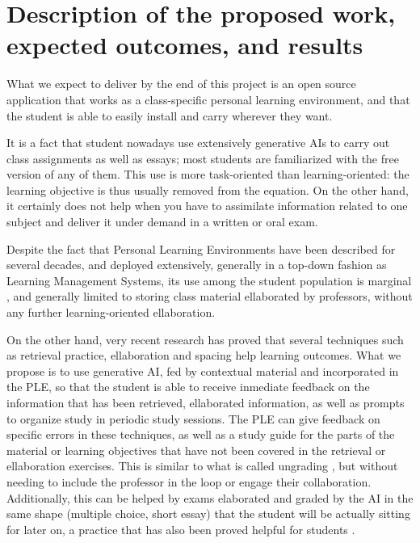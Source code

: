 \documentclass[a4paper,12pt]{article}
\begin{document}
\section{Description of the proposed work, expected outcomes, and results}

What we expect to deliver by the end of this project is an open source
application that works as a class-specific personal learning environment, and
that the student is able to easily install and carry wherever they want.

It is a fact that student nowadays use extensively generative AIs to carry out
class assignments as well as essays; most students are familiarized with the
free version of any of them. This use is more task-oriented than
learning-oriented: the learning objective is thus usually removed from the
equation. On the other hand, it certainly does not help when you have to
assimilate information related to one subject and deliver it under demand in a
written or oral exam.

Despite the fact that Personal Learning Environments have been described for
several decades, and deployed extensively, generally in a top-down fashion as
Learning Management Systems, its use among the student population is marginal
\cite{serhan2022systematic}, and generally limited to storing class material
ellaborated by professors, without any further learning-oriented
ellaboration.

On the other hand, very recent research \cite{ruiz2024learning} has proved that
several techniques such as retrieval practice, ellaboration and spacing help
learning outcomes. What we propose is to use generative AI, fed by contextual
material and incorporated in the PLE, so that the student is able to receive
inmediate feedback on the information that has been retrieved, ellaborated
information, as well as prompts to organize study in periodic study
sessions. The PLE can give feedback on specific errors in these techniques, as
well as a study guide for the parts of the material or learning objectives that
have not been covered in the retrieval or ellaboration exercises. This is
similar to what is called ungrading \cite{10.1145/3587102.3588816}, but without
needing to include the professor in the loop or engage their collaboration.
Additionally, this can be helped by exams elaborated and graded by the AI in the
same shape (multiple choice, short essay) that the student will be actually
sitting for later on, a practice that has also been proved helpful for students
\cite{YANG20197324}.
\end{document}
